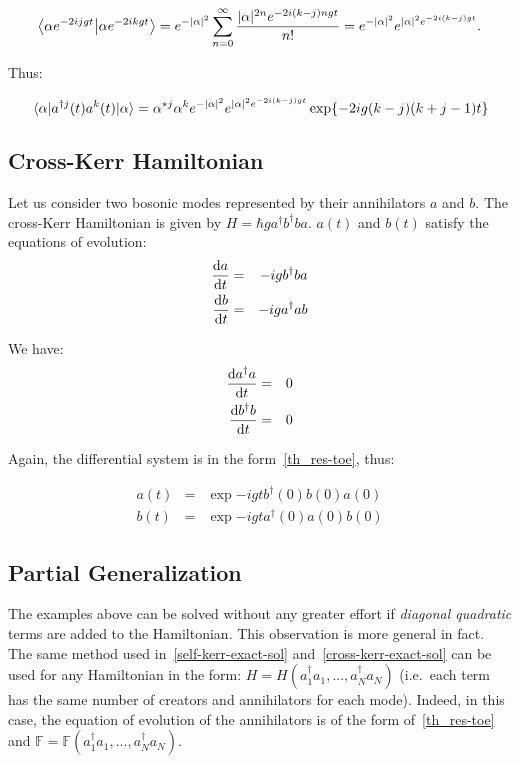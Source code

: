 \begin{equation*}
    \braket{\alpha e^{-2 i j g t}}{\alpha e^{-2 i k g t}} = e^{-|\alpha|^2} \sum_{n=0}^\infty \frac{|\alpha|^{2 n} e^{- 2 i (k-j) n g t}}{n!} = e^{-|\alpha|^2} e^{|\alpha|^2 e^{- 2 i (k-j) g t}}.
\end{equation*}

Thus:

\begin{equation}
    \mel{\alpha}{a^{\dagger j}(t) a^k(t)}{\alpha} = \alpha^{* j} \alpha^k e^{-|\alpha|^2} e^{|\alpha|^2 e^{- 2 i (k-j) g t}} \exp{- 2 i g (k - j) (k + j - 1) t}
\end{equation}

\subsection{Cross-Kerr Hamiltonian} \label{cross-kerr-exact-sol}
Let us consider two bosonic modes represented by their annihilators $a$ and $b$. The cross-Kerr Hamiltonian is given by $H = \hbar g a^\dagger b^\dagger b a$. $a(t)$ and $b(t)$ satisfy the equations of evolution:
\begin{eqnarray}
    \dv{a}{t} &=& -i g b^\dagger b a\\
    \dv{b}{t} &=& -i g a^\dagger a b
\end{eqnarray}

We have:
\begin{eqnarray}
    \dv{a^\dagger a}{t} &=& 0\\
    \dv{b^\dagger b}{t} &=& 0
\end{eqnarray}

Again, the differential system is in the form~\autoref{th_res-toe}, thus:

\begin{eqnarray}
    a(t) &=& \exp{-i g t b^\dagger(0) b(0)} a(0)\\
    b(t) &=& \exp{-i g t a^\dagger(0) a(0)} b(0)
\end{eqnarray}

\subsection{Partial Generalization} \label{gene-exact-sol}
The examples above can be solved without any greater effort if \textit{diagonal quadratic} terms are added to the Hamiltonian. This observation is more general in fact. The same method used in~\autoref{self-kerr-exact-sol} and~\autoref{cross-kerr-exact-sol} can be used for any Hamiltonian in the form: $H = H\left(a^\dagger_1 a_1, ..., a^\dagger_N a_N\right)$ (i.e.\@~each term has the same number of creators and annihilators for each mode). Indeed, in this case, the equation of evolution of the annihilators is of the form of~\autoref{th_res-toe} and $\mathbb{F} = \mathbb{F}\left(a^\dagger_1 a_1, ..., a^\dagger_N a_N\right)$.

